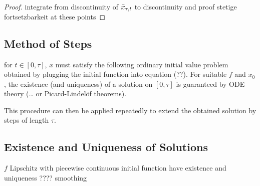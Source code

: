 \documentclass[10pt]{article}
\begin{document}
\begin{proof}
integrate from discontinuity of $\bar{x}_{\tau,t}$ to discontinuity and proof stetige fortsetzbarkeit at these points
\end{proof}

\subsection{Method of Steps} \label{sec:method-of-steps}
for $t\in [0,\tau]$, $x$ must satisfy the following ordinary initial value problem obtained by plugging the initial function into equation (??). For suitable $f$ and $x_0$, the existence (and uniqueness) of a solution on $[0,\tau]$ is guaranteed by ODE theory (\ldots{} or Picard-Lindelöf theorems).

This procedure can then be applied repeatedly to extend the obtained solution by steps of length $\tau$.

\subsection{Existence and Uniqueness of Solutions} \label{existence-and-uniqueness-of-solutions}

$f$ Lipschitz with piecewise continuous initial function have existence and uniqueness ???? smoothing
\end{document}
